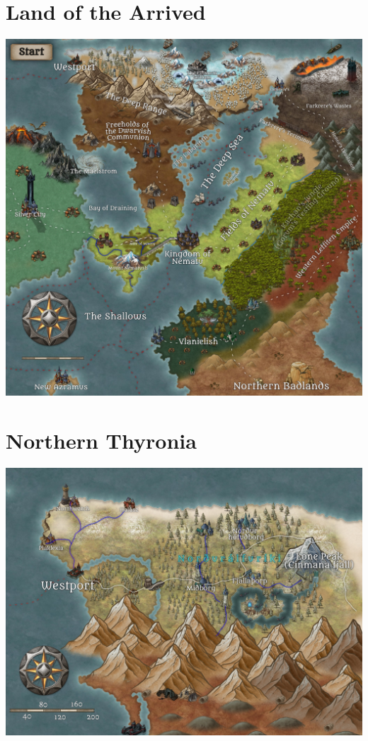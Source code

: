 \documentclass[letterpaper,twocolumn,openany,nodeprecatedcode]{dndbook}
\begin{document}
\onecolumn
\section{Land of the Arrived}

\includegraphics[width=\textwidth]{img/initial_region.jpg}


\section{Northern Thyronia}

\includegraphics[width=\textwidth]{img/westport_region.jpg}
\end{document}
